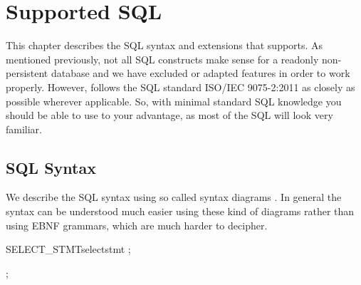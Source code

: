 
\chapter{Supported SQL}

This chapter describes the SQL syntax and extensions that \csvsqldb{} supports. As mentioned previously, not all SQL constructs make sense for a readonly non-persistent database and we have excluded or adapted features in order to work properly. However, \csvsqldb{} follows the SQL standard ISO/IEC 9075-2:2011 \cite{ISO_SQL_Standard} as closely as possible wherever applicable. So, with minimal standard SQL knowledge you should be able to use \csvsqldb{} to your advantage, as most of the SQL will look very familiar.

\section{SQL Syntax}
We describe the SQL syntax using so called syntax diagrams \cite{Wikipedia_Syntaxdiagram}. In general the syntax can be understood much easier using these kind of diagrams rather than using EBNF grammars, which are much harder to decipher.

\begin{SyntaxGrammar}{SELECT\_STMT}{selectstmt}
;

;
\end{SyntaxGrammar}

